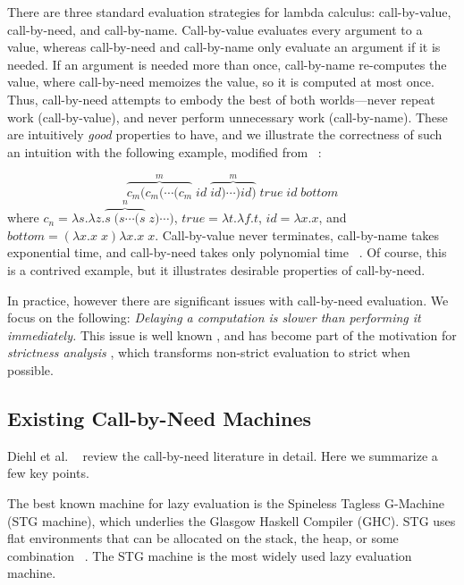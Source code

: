 There are three standard evaluation strategies for lambda calculus:
call-by-value, call-by-need, and call-by-name.  Call-by-value evaluates every argument
to a value, whereas call-by-need and call-by-name only evaluate an argument if
it is needed.  If an argument is needed more than once, call-by-name re-computes
the value, where call-by-need memoizes the value, so it is computed at most once.
Thus, call-by-need attempts to embody the best of both worlds---never repeat
work (call-by-value), and never perform unnecessary work (call-by-name). These
are intuitively \emph{good} properties to have, and we illustrate the
correctness of such an intuition with the following example, modified from
~\cite{danvy2013synthetic}:

$$ \overbrace{c_m (c_m (\cdots(c_m}^{m} \; id \; \overbrace{id)\cdots) id)}^{m} \; true \; id
\; bottom $$ where $c_n = \lambda s.\lambda z.\overbrace{s \; (s \cdots (s}^{n}
\; z) \cdots) $, $true = \lambda t.\lambda f.t$, $id=\lambda x.x$, and $bottom =
(\lambda x.x \; x) \lambda x.x \; x$. Call-by-value never terminates,
call-by-name takes exponential time, and call-by-need takes only polynomial time
~\cite{danvy2013synthetic}. Of course, this is a contrived example, but it
illustrates desirable properties of call-by-need.

In practice, however there are significant issues with call-by-need evaluation.
We focus on the following: \emph{Delaying a computation is slower than
performing it immediately.} This issue is well known
\cite{johnsson1984efficient,jonesstg}, and has become part of the motivation
for \emph{strictness analysis}
\cite{mycroft1982abstract,wadler1987projections}, which transforms non-strict
evaluation to strict when possible.

\subsection{Existing Call-by-Need Machines}

Diehl et al. ~\cite{diehl2000abstract} review the call-by-need
literature in detail.  Here we summarize a few key points.

The best known machine for lazy evaluation is the Spineless Tagless
G-Machine (STG machine), which underlies the Glasgow Haskell Compiler (GHC). 
STG uses flat environments that can be allocated on the stack, the heap,
or some combination ~\cite{jonesstg}. The STG machine is the
most widely used lazy evaluation machine. 

